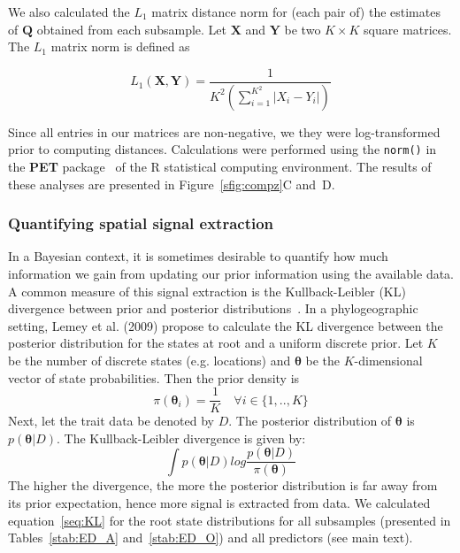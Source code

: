 \documentclass[a4paper,10pt]{article}
\begin{document}
We also calculated the $L_1$ matrix distance norm for (each pair of) the estimates of $\mathbf{Q}$ obtained from each subsample.
Let $\mathbf{X}$ and $\mathbf{Y}$ be two $K \times K$ square matrices.
The $L_1$ matrix norm is defined as

\begin{equation}
\label{seq:L1}
 L_1 (\mathbf{X}, \mathbf{Y}) = \frac{1}{K^{2} (\sum_{i=1}^{K^2} |X_i-Y_i| ) }
\end{equation}

Since all entries in our matrices are non-negative, we they were log-transformed prior to computing distances.
Calculations were performed using the \verb|norm()| in the \textbf{PET} package~\cite{PET} of the R statistical computing environment.
The results of these analyses are presented in Figure~\ref{sfig:compz}C and~D.

\subsubsection{Quantifying spatial signal extraction}
 In a Bayesian context, it is sometimes desirable to quantify how much information we gain from updating our prior information using the available data.
 A common measure of this signal extraction is the Kullback-Leibler (KL) divergence between prior and posterior distributions~\cite{M-KL}.
 In a phylogeographic setting, Lemey et al. (2009) \cite{M-roots} propose to calculate the KL divergence between the posterior distribution for the states at root and a uniform discrete prior.
 Let $K$ be the number of discrete states (e.g. locations) and $\boldsymbol\theta$ be the $K$-dimensional vector of state probabilities.
 Then the prior density is
 \begin{equation}
 \label{seq:prior}
  \pi(\boldsymbol\theta_i) = \frac{1}{K} \quad \forall i \in \{1,..,K\} 
 \end{equation}
Next, let the trait data be denoted by $D$.
The posterior distribution of $\boldsymbol\theta$ is $p(\boldsymbol\theta|D)$.
The Kullback-Leibler divergence is given by:
\begin{equation}
 \label{seq:KL}
 \int p(\boldsymbol\theta|D)log\frac{p(\boldsymbol\theta|D)}{\pi(\boldsymbol\theta)}
\end{equation}
The higher the divergence, the more the posterior distribution is far away from its prior expectation, hence more signal is extracted from data.
We calculated equation~\ref{seq:KL} for the root state distributions for all subsamples (presented in Tables~\ref{stab:ED_A} and~\ref{stab:ED_O}) and all predictors (see main text).
\end{document}

